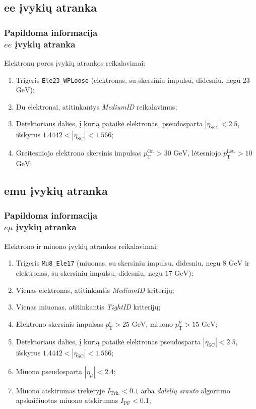 \documentclass[xcolor=dvipsnames]{beamer}
\newcommand{\pT}{\mathit{p}_{\mathrm{T}}}
\newcommand{\emu}{\mathit{e}\mu}
\newcommand{\ee}{\mathit{ee}}
\begin{document}
\begin{frame}
\subsection{ee įvykių atranka}
\frametitle{Papildoma informacija\\ \small $\ee$ įvykių atranka}
Elektronų poros įvykių atrankos reikalavimai:
\begin{enumerate}
\item Trigeris \texttt{Ele23\_WPLoose} (elektronas, su skersiniu impulsu, didesniu, negu $23$ $\mathrm{GeV}$);
\item Du elektronai, atitinkantys \textit{MediumID} reikalavimus;
\item Detektoriaus dalies, į kurią pataikė elektronas, pseudosparta $|\eta_{\mathrm{SC}}|<2.5$, išskyrus $1.4442<|\eta_{\mathrm{SC}}|<1.566$;
\item Greitesniojo elektrono skersinis impulsas $\pT^{\mathrm{Gr.}}>30$ $\mathrm{GeV}$, lėtesniojo $\pT^{\mathrm{Lėt.}}>10$ $\mathrm{GeV}$;
\end{enumerate}
\end{frame}

\begin{frame}
\subsection{emu įvykių atranka}
\frametitle{Papildoma informacija\\ \small $\emu$ įvykių atranka}
Elektrono ir miuono įvykių atrankos reikalavimai:
\begin{enumerate}
\item Trigeris \texttt{Mu8\_Ele17} (miuonas, su skersiniu impulsu, didesniu, negu $8$ $\mathrm{GeV}$ ir elektronas, su skersiniu impulsu, didesniu, negu $17$ $\mathrm{GeV}$);
\item Vienas elektronas, atitinkantis \textit{MediumID} kriterijų;
\item Vienas miuonas, atitinkantis \textit{TightID} kriterijų;
\item Elektrono skersinis impulsas $\pT^{\mathit{e}}>25$ $\mathrm{GeV}$, miuono $\pT^{\mu}>15$ $\mathrm{GeV}$;
\item Detektoriaus dalies, į kurią pataikė elektronas pseudosparta $|\eta_{\mathrm{SC}}|<2.5$, išskyrus $1.4442<|\eta_{\mathrm{SC}}|<1.566$;
\item Miuono pseudosparta $|\eta_{\mu}|<2.4$;
\item Miuono atskirumas trekeryje $\mathit{I}_{\mathrm{Trk.}}<0.1$ arba \textit{dalelių srauto} algoritmo apskaičiuotas miuono atskirumas $\mathit{I}_{\mathrm{PF}}<0.1$;
\end{enumerate}
\end{frame}
\end{document}

